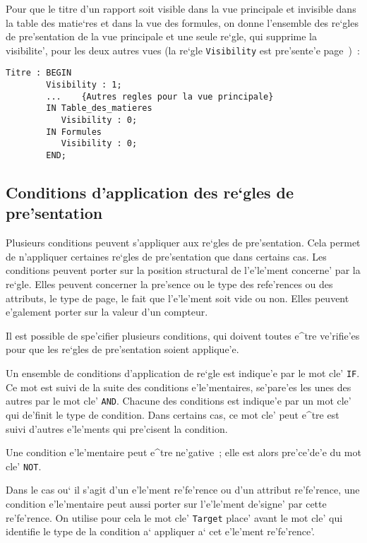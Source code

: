 {\begin{example}
Pour que le titre d'un rapport soit visible
dans la vue principale et invisible dans la table des matie`res et dans
la vue des formules, on donne l'ensemble des re`gles de pre'sentation de la
vue principale et une seule re`gle, qui supprime la visibilite', pour les
deux autres vues (la re`gle {\tt Visibility} est pre'sente'e
page~\pageref{visib})~:

\begin{verbatim}
Titre : BEGIN
        Visibility : 1;
        ...    {Autres regles pour la vue principale}
        IN Table_des_matieres
           Visibility : 0;
        IN Formules
           Visibility : 0;
        END;
\end{verbatim}
\end{example}

\subsection{Conditions d'application des re`gles de pre'sentation}

Plusieurs conditions peuvent s'appliquer aux re`gles de
pre'sentation. Cela permet de n'appliquer certaines re`gles de pre'sentation
que dans certains cas. Les conditions peuvent porter sur la position
structural de l'e'le'ment concerne' par la re`gle.
Elles peuvent concerner la pre'sence ou le type des refe'rences ou des
attributs, le type de page, le fait que l'e'le'ment soit vide ou non.
Elles peuvent e'galement porter sur la valeur d'un compteur.

Il est possible de spe'cifier plusieurs conditions, qui doivent
toutes e^tre ve'rifie'es pour que les re`gles de pre'sentation soient
applique'e.

Un ensemble de conditions d'application de re`gle est indique'e par le mot cle' {\tt IF}.
Ce mot est suivi de la suite des conditions e'le'mentaires, se'pare'es les unes des autres par le mot cle'
{\tt AND}. Chacune des conditions est indique'e par un mot cle' qui de'finit
le type de condition. Dans certains cas, ce mot cle' peut e^tre est suivi
d'autres e'le'ments qui pre'cisent la condition.

Une condition e'le'mentaire peut e^tre ne'gative~; elle est alors pre'ce'de'e
du mot cle' {\tt NOT}.

Dans le cas ou` il s'agit d'un e'le'ment re'fe'rence ou d'un attribut
re'fe'rence, une condition e'le'mentaire peut aussi porter sur l'e'le'ment
de'signe' par cette re'fe'rence. On utilise pour cela le mot cle' {\tt Target}
place' avant le mot cle' qui identifie le type de la condition a` appliquer
a` cet e'le'ment re'fe'rence'.

}
